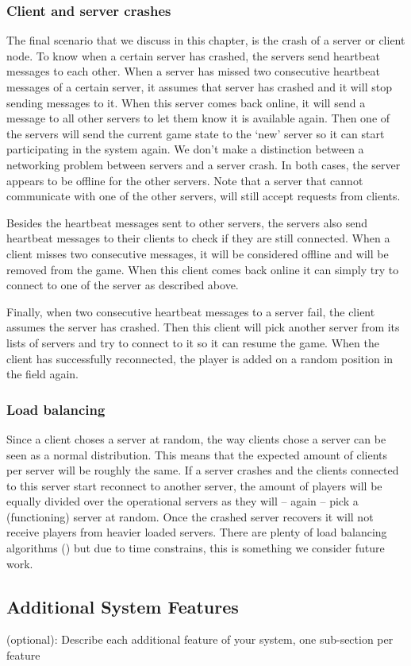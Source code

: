 \subsubsection{Client and server crashes}
\label{subsubsec:client_server_crashes}
The final scenario that we discuss in this chapter, is the crash of a server or client node. 
To know when a certain server has crashed, the servers send heartbeat messages to each other. 
When a server has missed two consecutive heartbeat messages of a certain server, it assumes that server has crashed and it will stop sending messages to it.
When this server comes back online, it will send a message to all other servers to let them know it is available again. 
Then one of the servers will send the current game state to the `new' server so it can start participating in the system again.
We don't make a distinction between a networking problem between servers and a server crash. 
In both cases, the server appears to be offline for the other servers. 
Note that a server that cannot communicate with one of the other servers, will still accept requests from clients.

Besides the heartbeat messages sent to other servers, the servers also send heartbeat messages to their clients to check if they are still connected. 
When a client misses two consecutive messages, it will be considered offline and will be removed from the game.
When this client comes back online it can simply try to connect to one of the server as described above.

Finally, when two consecutive heartbeat messages to a server fail, the client assumes the server has crashed. 
Then this client will pick another server from its lists of servers and try to connect to it so it can resume the game. 
When the client has successfully reconnected, the player is added on a random position in the field again.

\subsubsection{Load balancing}
\label{subsubsec:load_balancing}
	Since a client choses a server at random, the way clients chose a server can be seen as a normal distribution. 
	This means that the expected amount of clients per server will be roughly the same.
	If a server crashes and the clients connected to this server start reconnect to another server, the amount of players will be equally divided over the operational servers as they will -- again -- pick a (functioning) server at random.
	Once the crashed server recovers it will not receive players from heavier loaded servers. 
	There are plenty of load balancing algorithms () but due to time constrains, this is something we consider future work.

\subsection{Additional System Features}
\label{subsec:additional_features}
(optional): Describe each additional feature of your system, one sub-section per feature
 
